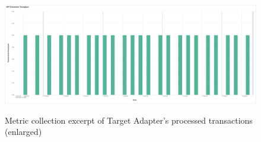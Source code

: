 \centering
\begin{figure}[htbp]
    \centering
     {
        \includegraphics[width=1.8\textwidth]{chapters/images/art-performance/art-transaction-throughput-minute.png}
    }
    \caption{Metric collection excerpt of Target Adapter's processed transactions (enlarged)}
    \label{fig:appendix02:results:arttransactionminute}
\end{figure}

